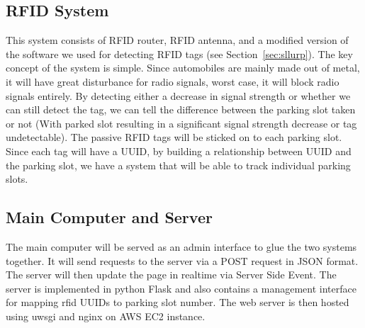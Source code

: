 \documentclass[12pt, a4paper]{article}
\begin{document}
\subsection{RFID System}
This system consists of RFID router, RFID antenna, and a modified version of the software we used for detecting RFID tags (see Section~\ref{sec:sllurp}). The key concept of the system is simple. Since automobiles are mainly made out of metal, it will have great disturbance for radio signals, worst case, it will block radio signals entirely. By detecting either a decrease in signal strength or whether we can still detect the tag, we can tell the difference between the parking slot taken or not (With parked slot resulting in a significant signal strength decrease or tag undetectable). The passive RFID tags will be sticked on to each parking slot. Since each tag will have a UUID, by building a relationship between UUID and the parking slot, we have a system that will be able to track individual parking slots.
\subsection{Main Computer and Server}
The main computer will be served as an admin interface to glue the two systems together. It will send requests to the server via a POST request in JSON format. The server will then update the page in realtime via Server Side Event. The server is implemented in python Flask and also contains a management interface for mapping rfid UUIDs to parking slot number. The web server is then hosted using uwsgi and nginx on AWS EC2 instance.
\end{document}
